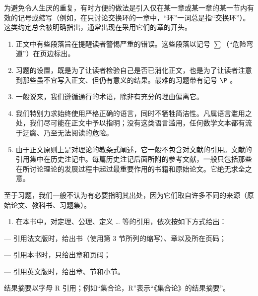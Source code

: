 为避免令人生厌的重复，有时方便的做法是引入仅在某一章或某一章的某一节内有效的记号或缩写（例如，在只讨论交换环的一章中，“环”一词总是指“交换环”）。这类约定总会被明确指出，通常出现在采用它们的章的开头。

\begin{enumerate}
\def\labelenumi{\arabic{enumi}.}
\setcounter{enumi}{5}
\item
  正文中有些段落旨在提醒读者警惕严重的错误。这些段落以记号 \(\sum\)（“危险弯道”）在页边标出。
\item
  习题的设置，既是为了让读者检验自己是否已消化正文，也是为了让读者注意到那些虽不宜写入正文、但仍有意义的结果。最难的习题带有记号 \(\P\) 。
\item
  一般说来，我们遵循通行的术语，除非有充分的理由偏离它。
\item
  我们特别力求始终使用严格正确的语言，同时不牺牲简洁性。凡属语言滥用之处，我们尽可能在正文中予以指明；没有这类语言滥用，任何数学文本都有流于迂腐、乃至无法阅读的危险。
\item
  由于正文原则上是对理论的教条式阐述，它一般不包含对文献的引用。文献的引用集中在历史注记中。每篇历史注记后面所附的参考文献，一般只包括那些在所讨论理论的发展过程中起过最重要作用的书籍和原始论文。它绝无求全之意。
\end{enumerate}

至于习题，我们一般不认为有必要指明其出处，因为它们取自许多不同的来源（原始论文、教科书、习题集）。

\begin{enumerate}
\def\labelenumi{\arabic{enumi}.}
\setcounter{enumi}{10}
\tightlist
\item
  在本书中，对定理、公理、定义 \ldots{} 等的引用，依次按如下方式给出：
\end{enumerate}

--- 引用法文版时，给出书（使用第 3 节所列的缩写）、章以及所在页码；

--- 引用本书时，只给出章和页码；

--- 引用英文版时，给出章、节和小节。

结果摘要以字母 R 引用；例如“集合论，R”表示“《集合论》的结果摘要”。

